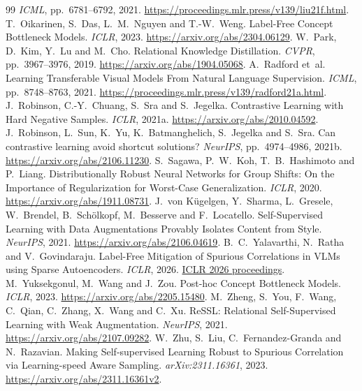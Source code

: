 \documentclass{article}
\begin{document}
\begin{thebibliography}{99}
\emph{ICML}, pp.~6781--6792, 2021.
\url{https://proceedings.mlr.press/v139/liu21f.html}.
T.~Oikarinen, S.~Das, L.~M.~Nguyen and T.-W.~Weng.
Label-Free Concept Bottleneck Models. \emph{ICLR}, 2023.
\url{https://arxiv.org/abs/2304.06129}.
W.~Park, D.~Kim, Y.~Lu and M.~Cho.
Relational Knowledge Distillation. \emph{CVPR}, pp.~3967--3976, 2019.
\url{https://arxiv.org/abs/1904.05068}.
A.~Radford et~al.
Learning Transferable Visual Models From Natural Language Supervision.
\emph{ICML}, pp.~8748--8763, 2021.
\url{https://proceedings.mlr.press/v139/radford21a.html}.
J.~Robinson, C.-Y.~Chuang, S.~Sra and S.~Jegelka.
Contrastive Learning with Hard Negative Samples. \emph{ICLR}, 2021a.
\url{https://arxiv.org/abs/2010.04592}.
J.~Robinson, L.~Sun, K.~Yu, K.~Batmanghelich, S.~Jegelka and S.~Sra.
Can contrastive learning avoid shortcut solutions? \emph{NeurIPS}, pp.~4974--4986, 2021b.
\url{https://arxiv.org/abs/2106.11230}.
S.~Sagawa, P.~W.~Koh, T.~B.~Hashimoto and P.~Liang.
Distributionally Robust Neural Networks for Group Shifts: On the Importance
of Regularization for Worst-Case Generalization.
\emph{ICLR}, 2020. \url{https://arxiv.org/abs/1911.08731}.
J.~von K\"ugelgen, Y.~Sharma, L.~Gresele, W.~Brendel, B.~Sch\"olkopf, M.~Besserve and F.~Locatello.
Self-Supervised Learning with Data Augmentations Provably Isolates Content from Style.
\emph{NeurIPS}, 2021. \url{https://arxiv.org/abs/2106.04619}.
B.~C.~Yalavarthi, N.~Ratha and V.~Govindaraju.
Label-Free Mitigation of Spurious Correlations in VLMs using Sparse Autoencoders.
\emph{ICLR}, 2026.
\href{https://proceedings.iclr.cc/paper_files/paper/2026/hash/359242d225d2fba218a85e147803f8b7-Abstract-Conference.html}{ICLR 2026 proceedings}.
M.~Yuksekgonul, M.~Wang and J.~Zou.
Post-hoc Concept Bottleneck Models. \emph{ICLR}, 2023.
\url{https://arxiv.org/abs/2205.15480}.
M.~Zheng, S.~You, F.~Wang, C.~Qian, C.~Zhang, X.~Wang and C.~Xu.
ReSSL: Relational Self-Supervised Learning with Weak Augmentation.
\emph{NeurIPS}, 2021. \url{https://arxiv.org/abs/2107.09282}.
W.~Zhu, S.~Liu, C.~Fernandez-Granda and N.~Razavian.
Making Self-supervised Learning Robust to Spurious Correlation via
Learning-speed Aware Sampling. \emph{arXiv:2311.16361}, 2023.
\url{https://arxiv.org/abs/2311.16361v2}.


\end{thebibliography}
\end{document}
